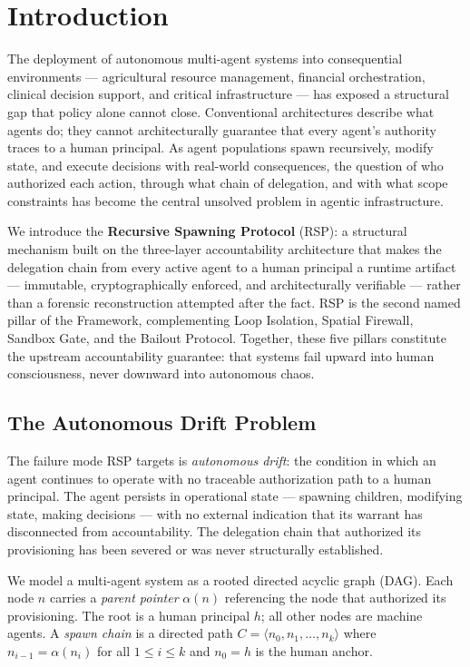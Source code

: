 \section{Introduction}
\label{sec:rs-intro}

The deployment of autonomous multi-agent systems into consequential environments — agricultural resource management, financial orchestration, clinical decision support, and critical infrastructure — has exposed a structural gap that policy alone cannot close. Conventional architectures describe what agents do; they cannot architecturally guarantee that every agent's authority traces to a human principal. As agent populations spawn recursively, modify state, and execute decisions with real-world consequences, the question of who authorized each action, through what chain of delegation, and with what scope constraints has become the central unsolved problem in agentic infrastructure.

We introduce the \textbf{Recursive Spawning Protocol} (RSP): a structural mechanism built on the \bxthree{} three-layer accountability architecture that makes the delegation chain from every active agent to a human principal a runtime artifact — immutable, cryptographically enforced, and architecturally verifiable — rather than a forensic reconstruction attempted after the fact. RSP is the second named pillar of the \bxthree{} Framework, complementing Loop Isolation, Spatial Firewall, Sandbox Gate, and the Bailout Protocol. Together, these five pillars constitute the upstream accountability guarantee: that \bxthree{} systems fail upward into human consciousness, never downward into autonomous chaos.

\subsection{The Autonomous Drift Problem}

The failure mode RSP targets is \emph{autonomous drift}: the condition in which an agent continues to operate with no traceable authorization path to a human principal. The agent persists in operational state — spawning children, modifying state, making decisions — with no external indication that its warrant has disconnected from accountability. The delegation chain that authorized its provisioning has been severed or was never structurally established.

We model a multi-agent system as a rooted directed acyclic graph (DAG). Each node $n$ carries a \emph{parent pointer} $\alpha(n)$ referencing the node that authorized its provisioning. The root is a human principal $h$; all other nodes are machine agents. A \emph{spawn chain} is a directed path $C = \langle n_0, n_1, \ldots, n_k \rangle$ where $n_{i-1} = \alpha(n_i)$ for all $1 \leq i \leq k$ and $n_0 = h$ is the human anchor.

